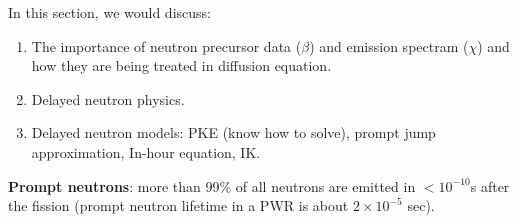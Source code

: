 \documentclass{school-22.211-notes}
\date{April 25, 2012}
\begin{document}
\maketitle

In this section, we would discuss: 
\begin{enumerate}
\item The importance of neutron precursor data ($\beta$) and emission spectram ($\chi$) and how they are being treated in diffusion equation. 

\item Delayed neutron physics. 

\item Delayed neutron models: PKE (know how to solve), prompt jump approximation, In-hour equation, IK. 
\end{enumerate}


\textbf{Prompt neutrons}: more than 99\% of all neutrons are emitted in $<10^{-10}$s after the fission (prompt neutron lifetime in a PWR is about $2 \times 10^{-5}$ sec). 
\end{document}
